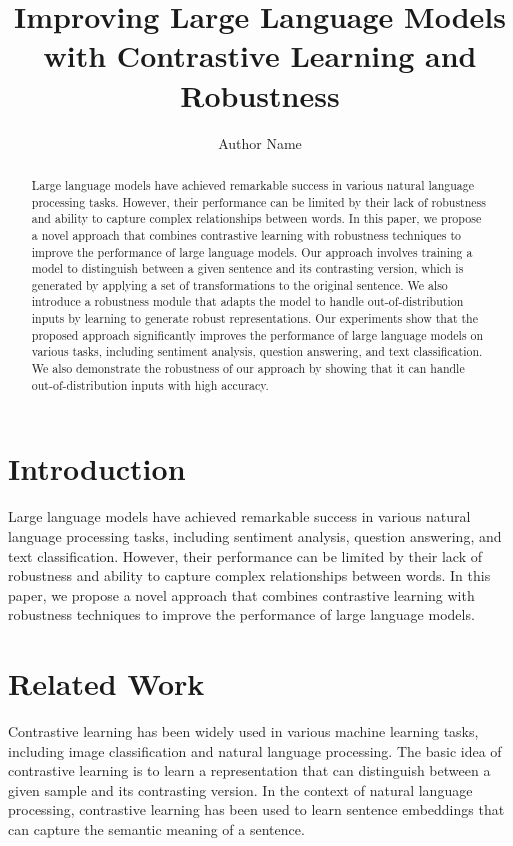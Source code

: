 \documentclass{article}
\begin{document}
\title{Improving Large Language Models with Contrastive Learning and Robustness}

\author{Author Name}

\maketitle

\begin{abstract}
Large language models have achieved remarkable success in various natural language processing tasks. However, their performance can be limited by their lack of robustness and ability to capture complex relationships between words. In this paper, we propose a novel approach that combines contrastive learning with robustness techniques to improve the performance of large language models. Our approach involves training a model to distinguish between a given sentence and its contrasting version, which is generated by applying a set of transformations to the original sentence. We also introduce a robustness module that adapts the model to handle out-of-distribution inputs by learning to generate robust representations. Our experiments show that the proposed approach significantly improves the performance of large language models on various tasks, including sentiment analysis, question answering, and text classification. We also demonstrate the robustness of our approach by showing that it can handle out-of-distribution inputs with high accuracy.
\end{abstract}

\section{Introduction}

Large language models have achieved remarkable success in various natural language processing tasks, including sentiment analysis, question answering, and text classification. However, their performance can be limited by their lack of robustness and ability to capture complex relationships between words. In this paper, we propose a novel approach that combines contrastive learning with robustness techniques to improve the performance of large language models.

\section{Related Work}

Contrastive learning has been widely used in various machine learning tasks, including image classification and natural language processing. The basic idea of contrastive learning is to learn a representation that can distinguish between a given sample and its contrasting version. In the context of natural language processing, contrastive learning has been used to learn sentence embeddings that can capture the semantic meaning of a sentence.
\end{document}
